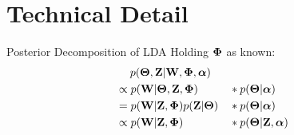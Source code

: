 \documentclass{beamer}
\begin{document}
\section*{Technical Detail}
\begin{frame}{Posterior Decomposition of LDA}
\label{fm:post}
Holding $\boldsymbol{\Phi}$ as known:
\begin{alignat*}{4}
& \quad \;
p( \boldsymbol{\Theta},{\bf Z} | {\bf W}, \boldsymbol{\Phi}, \boldsymbol{\alpha}) 
\\
& \propto 
p( {\bf W} | \boldsymbol{\Theta},{\bf Z}, \boldsymbol{\Phi}) 
&& * p(\boldsymbol{\Theta} |\boldsymbol{\alpha})
\\
&= 
p( {\bf W} | {\bf Z}, \boldsymbol{\Phi}) p({\bf Z}|\boldsymbol{\Theta}) 
&& * p(\boldsymbol{\Theta} | \boldsymbol{\alpha})
\\
&\propto
p( {\bf W} | {\bf Z}, \boldsymbol{\Phi}) && * p(\boldsymbol{\Theta} |{\bf Z}, \boldsymbol{\alpha})
\end{alignat*}
\end{frame}
\end{document}

